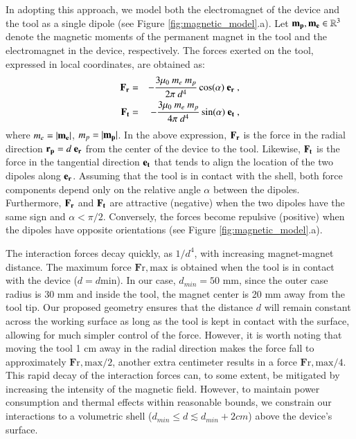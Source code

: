 In adopting this approach, we model both the electromagnet of the device and the tool as a single dipole (see Figure \ref{fig:magnetic_model}.a). Let $\mathbf{m_p}, \mathbf{m_{e}} \in \mathbb{R}^3$ denote the magnetic moments of the permanent magnet in the tool and the electromagnet in the device, respectively. The forces exerted on the tool, expressed in local coordinates, are obtained as:
\begin{eqnarray}
    \mathbf{F_{r}} &=& - \frac{3 \mu_0 \ m_{e} \ m_{p}}{2 \pi \ d^4} \cos(\alpha) \ \mathbf{e_r} \label{eq:Fr}\ ,\\ 
    \mathbf{F_{t}} &=& - \frac{3 \mu_0 \ m_{e} \ m_{p}}{4 \pi \ d^4} \sin(\alpha) \ \mathbf{e_t} \label{eq:Ft}\ ,
\end{eqnarray}
\noindent where $m_{e}=|\mathbf{m_{e}}|$, $m_{p}=|\mathbf{m_p}|$. In the above expression, $\mathbf{F_{r}}$ is the force in the radial direction $\mathbf{r_{p}} = d \ \mathbf{e_r}$ from the center of the device to the tool. Likewise, $\mathbf{F_{t}}$ is the force in the tangential direction $\mathbf{e_t}$ that tends to align the location of the two dipoles along $\mathbf{e_r}$. Assuming that the tool is in contact with the shell, both force components depend only on the relative angle $\alpha$ between the dipoles. Furthermore, $\mathbf{F_{r}}$ and $\mathbf{F_{t}}$ are attractive (negative) when the two dipoles have the same sign and $\alpha<\pi/2$. Conversely, the forces become repulsive (positive) when the dipoles have opposite orientations (see Figure \ref{fig:magnetic_model}.a).

The interaction forces decay quickly, as $1/d^4$, with increasing magnet-magnet distance. The maximum force $\mathbf{F}\mathrm{r,max}$ is obtained when the tool is in contact with the device ($d = d\mathrm{min}$). In our case, $d_{min} = 50$ mm, since the outer case radius is 30 mm and inside the tool, the magnet center is 20 mm away from the tool tip. Our proposed geometry ensures that the distance $d$ will remain constant across the working surface as long as the tool is kept in contact with the surface, allowing for much simpler control of the force. However, it is worth noting that moving the tool 1 cm away in the radial direction makes the force fall to approximately $\mathbf{F}\mathrm{r,max}/2$, another extra centimeter results in a force $\mathbf{F}\mathrm{r,max}/4$. This rapid decay of the interaction forces can, to some extent, be mitigated by increasing the intensity of the magnetic field. However, to maintain power consumption and thermal effects within reasonable bounds, we constrain our interactions to a volumetric shell ($d_{min} \leq d \lesssim d_{min} + 2cm$) above the device's surface.

